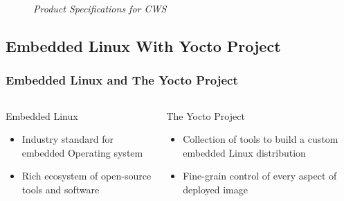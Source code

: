 \documentclass[8pt,compress,aspectratio=169]{beamer}
\begin{document}
\begin{frame}
\begin{minipage}{0.50\textwidth}
\begin{figure}
            \caption{\it Product Specifications for CWS}
        \end{figure}
        \vspace{0.2cm}
    \end{minipage}
\end{frame}


\subsection{Embedded Linux With Yocto Project}
\begin{frame}
  \frametitle{Embedded Linux and The Yocto Project}
  \begin{columns}
    \begin{block}{Embedded Linux}
      \begin{itemize}
        \item Industry standard for embedded Operating system
        \item Rich ecosystem of open-source tools and software
      \end{itemize}
    \end{block}
    \begin{block}{The Yocto Project}
      \begin{itemize}
        \item Collection of tools to build a custom embedded Linux distribution
        \item Fine-grain control of every aspect of deployed image
      \end{itemize}
    \end{block}
  \end{columns}
\end{frame}
\end{document}
